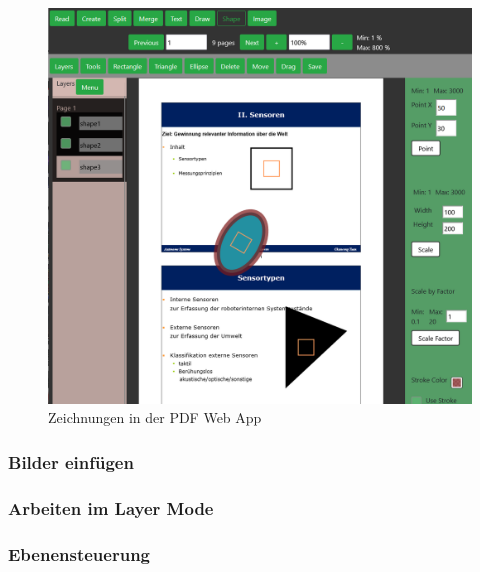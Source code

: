\begin{figure}[!htbp]
	\centering
	\includegraphics[width=1\textwidth]{"images/shaping.png"}
	\caption{Zeichnungen in der PDF Web App}
	\label{fig:shaping}
\end{figure}



\subsubsection{Bilder einfügen}

\subsubsection{Arbeiten im Layer Mode}

\subsubsection{Ebenensteuerung}


